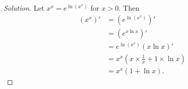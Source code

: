 \begin{proof}[Solution]
  Let $x^x=e^{\ln(x^x)}$ for $x>0$. Then
  \[
    \begin{aligned}
      (x^x)'&=\left(e^{\ln(x^x)}\right)'\\
        &=\left(e^{x\ln x}\right)'\\
        &=e^{\ln(x^x)}(x\ln x)'\\
        &=x^x\left(x\times\frac1x+1\times\ln x\right)\\
        &=x^x(1+\ln x).
    \end{aligned}
  \]
\end{proof}
